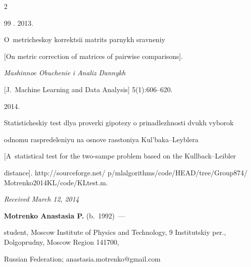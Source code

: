 \begin{multicols}{2}
{{\begin{thebibliography}{99}
.  2013.

O~metricheskoy korrektsii matrits parnykh sravneniy

[On metric correction of matrices of pairwise comparisons].

\textit{Mashinnoe Obuchenie i Analiz Dannykh}

[J.~Machine Learning and Data Analysis]  5(1):606--620.




  2014.

Statisticheskiy test dlya proverki gipotezy o prinadlezhnosti dvukh vyborok

odnomu raspredeleniyu na osnove rasstoniya Kul'baka--Leyblera

[A~statistical test for the two-sampe problem based on the Kullback--Leibler

distance]. {\sf http://sourceforge.net/ p/mlalgorithms/code/HEAD/tree/Group874/ Motrenko2014KL/code/KLtest.m}.



\end{thebibliography}

} }





\end{multicols}



\vspace*{-6pt}



\hfill{\small\textit{Received March 12, 2014}}



\vspace*{-18pt}









\Contr



\noindent

\textbf{Motrenko Anastasia P.} (b.\ 1992)~---

student, Moscow Institute of Physics and Technology, 9 Institutskiy per., Dolgoprudny, Moscow Region 141700,

Russian Federation;   anastasia.motrenko@gmail.com



\vspace*{3pt}



